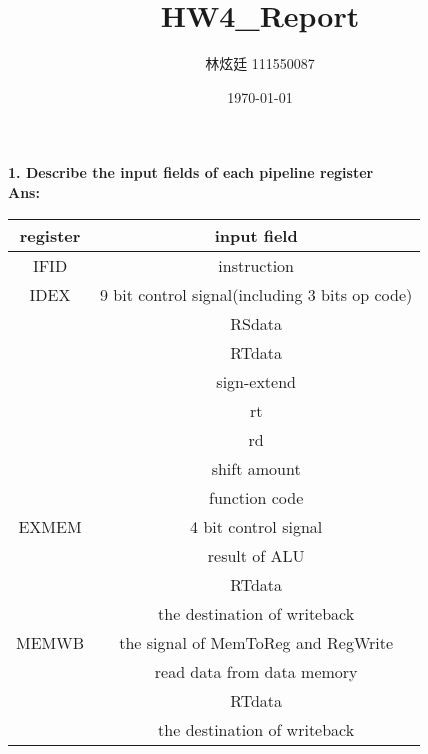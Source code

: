 \documentclass[a4paper, 12pt]{article}
\begin{document}
\title{HW4\_Report}
\author{林炫廷 111550087}
\date{\today}
\maketitle
{\bf 1. Describe the input ﬁelds of each pipeline register}\\
{\bf Ans: }\\
\begin{center}
    \begin{tabular}{|c|c|}
        \hline
        {\bf register} & {\bf input field}                              \\
        \hline
        IFID           & instruction                                    \\
        \hline
        IDEX           & 9 bit control signal(including 3 bits op code) \\
                       & RSdata                                         \\
                       & RTdata                                         \\
                       & sign-extend                                    \\
                       & rt                                             \\
                       & rd                                             \\
                       & shift amount                                   \\
                       & function code                                  \\
        \hline
        EXMEM          & 4 bit control signal                           \\
                       & result of ALU                                  \\
                       & RTdata                                         \\
                       & the destination of writeback                   \\
        \hline
        MEMWB          & the signal of MemToReg and RegWrite            \\
                       & read data from data memory                     \\
                       & RTdata                                         \\
                       & the destination of writeback                   \\
        \hline
    \end{tabular}
\end{center}
\end{document}
